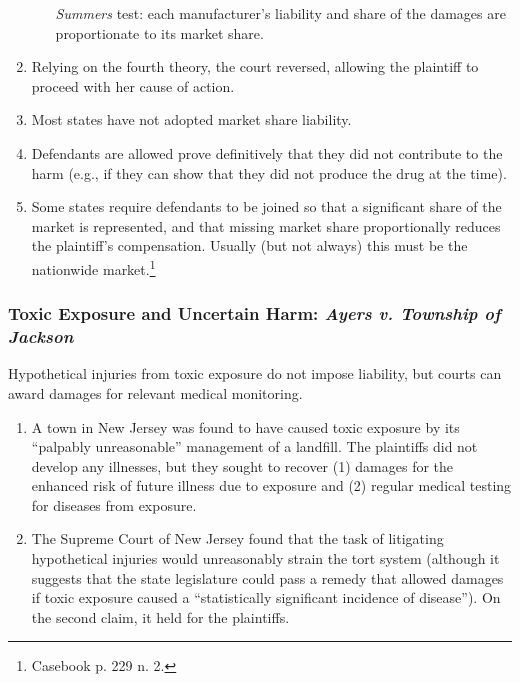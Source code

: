 \begin{enumerate}
\begin{enumerate}
        \emph{Summers} test: each manufacturer's liability and share of the 
        damages are proportionate to its market share.
    \end{enumerate}
    \item Relying on the fourth theory, the court reversed, allowing the 
    plaintiff to proceed with her cause of action.
    \item Most states have not adopted market share liability.
    \item Defendants are allowed prove definitively that they did not 
    contribute to the harm (e.g., if they can show that they did not produce 
    the drug at the time).
    \item Some states require defendants to be joined so that a significant 
    share of the market is represented, and that missing market share 
    proportionally reduces the plaintiff's compensation. Usually (but not 
    always) this must be the nationwide market.\footnote{Casebook p. 229 n. 
    2.}
\end{enumerate}

\subsubsection{Toxic Exposure and Uncertain Harm: \emph{Ayers v. Township of Jackson}}

Hypothetical injuries from toxic exposure do not impose liability, but courts 
can award damages for relevant medical monitoring.

\begin{enumerate}
    \item A town in New Jersey was found to have caused toxic exposure by its 
    ``palpably unreasonable'' management of a landfill. The plaintiffs did not 
    develop any illnesses, but they sought to recover (1) damages for the 
    enhanced risk of future illness due to exposure and (2) regular medical 
    testing for diseases from exposure.
    \item The Supreme Court of New Jersey found 
    that the task of litigating hypothetical injuries would unreasonably strain 
    the tort system (although it suggests that the state legislature could 
    pass a remedy that allowed damages if toxic exposure caused a 
    ``statistically significant incidence of disease''). On the second claim, 
    it held for the plaintiffs.
\end{enumerate}

